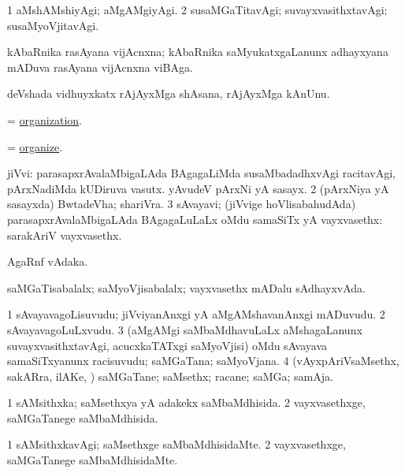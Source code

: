 \bentry
{}
\gl{\kirxvi}
\bmng
\bnum
\num{1} aMshAMshiyAgi; aMgAMgiyAgi. 
\num{2} susaMGaTitavAgi; suvayxvasithxtavAgi; susaMyoVjitavAgi. 
\enum
\emng
\eentry

\bentry
{}
\gl{\nA}
\bmng
kAbaRnika rasAyana vijAcnxna; kAbaRnika saMyukatxgaLanunx adhayxyana mADuva rasAyana vijAcnxna viBAga. 
\emng
\eentry

\bentry
{}
\gl{\nA}
\bmng
deVshada vidhuyxkatx rAjAyxMga shAsana, rAjAyxMga kAnUnu. 
\emng
\eentry

\bentry
{}
\gl{\nA}
\bmng
= \hyperlink{organization}{organization}. 
\emng
\eentry

\bentry
{}
\gl{\kirx}
\bmng
= \hyperlink{organize}{organize}. 
\emng
\eentry

\bentry
{}
\gl{\nA}
\bmng
\bnum
{} jiVvi: 
\banum
{} parasapxrAvalaMbigaLAda BAgagaLiMda susaMbadadhxvAgi racitavAgi, pArxNadiMda kUDiruva vasutx. 
 yAvudeV pArxNi yA sasayx. 
\eanum
\numie
\num{2} (pArxNiya yA sasayxda) BwtadeVha; shariVra. 
\num{3} sAvayavi; (jiVvige hoVlisabahudAda) parasapxrAvalaMbigaLAda BAgagaLuLaLx oMdu samaSiTx yA vayxvasethx:  sarakAriV vayxvasethx. 
\enum
\emng
\eentry

\bentry
{}
\gl{\gu}
\bmng
AgaRnf vAdaka. 
\emng
\eentry

\bentry
{}
\gl{\gu}
\bmng
saMGaTisabalalx; saMyoVjisabalalx; vayxvasethx mADalu sAdhayxvAda. 
\emng
\eentry

\bentry
{}
\gl{\nA}
\bmng
\bnum
\num{1} sAvayavagoLisuvudu; jiVviyanAnxgi yA aMgAMshavanAnxgi mADuvudu. 
\num{2} sAvayavagoLuLxvudu. 
\num{3} (aMgAMgi saMbaMdhavuLaLx aMshagaLanunx suvayxvasithxtavAgi, acucxkaTATxgi saMyoVjisi) oMdu sAvayava samaSiTxyanunx racisuvudu; saMGaTana; saMyoVjana. 
\num{4} (vAyxpAriVsaMsethx, sakARra, ilAKe, \mo) saMGaTane; saMsethx; racane; saMGa; samAja. 
\enum
\emng
\eentry

\bentry
{}
\gl{\gu}
\bmng
\bnum
\num{1} sAMsithxka; saMsethxya yA adakekx saMbaMdhisida. 
\num{2} vayxvasethxge, saMGaTanege saMbaMdhisida. 
\enum
\emng
\eentry

\bentry
{}
\gl{\kirxvi}
\bmng
\bnum
\num{1} sAMsithxkavAgi; saMsethxge saMbaMdhisidaMte. 
\num{2} vayxvasethxge, saMGaTanege saMbaMdhisidaMte. 
\enum
\emng
\eentry

